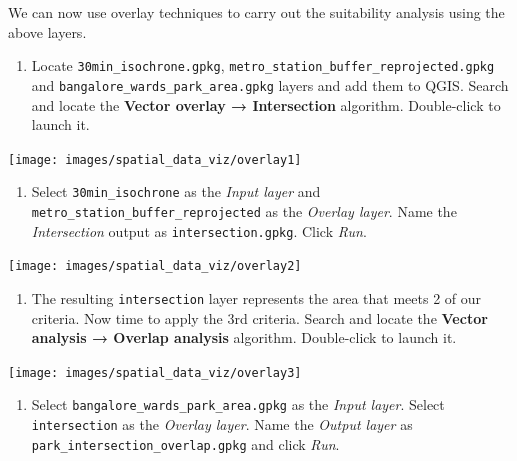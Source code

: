 \documentclass[
  12pt,
  a4paper]{article}
\providecommand{\tightlist}{%
  \setlength{\itemsep}{0pt}\setlength{\parskip}{0pt}}
\begin{document}
We can now use overlay techniques to carry out the suitability analysis
using the above layers.

\begin{enumerate}
\def\labelenumi{\arabic{enumi}.}
\tightlist
\item
  Locate \texttt{30min\_isochrone.gpkg},
  \texttt{metro\_station\_buffer\_reprojected.gpkg} and
  \texttt{bangalore\_wards\_park\_area.gpkg} layers and add them to
  QGIS. Search and locate the \textbf{Vector overlay → Intersection}
  algorithm. Double-click to launch it.
\end{enumerate}

\begin{center}\texttt{[image: images/spatial\_data\_viz/overlay1]} \end{center}

\begin{enumerate}
\def\labelenumi{\arabic{enumi}.}
\setcounter{enumi}{1}
\tightlist
\item
  Select \texttt{30min\_isochrone} as the \emph{Input layer} and
  \texttt{metro\_station\_buffer\_reprojected} as the \emph{Overlay
  layer}. Name the \emph{Intersection} output as
  \texttt{intersection.gpkg}. Click \emph{Run}.
\end{enumerate}

\begin{center}\texttt{[image: images/spatial\_data\_viz/overlay2]} \end{center}

\begin{enumerate}
\def\labelenumi{\arabic{enumi}.}
\setcounter{enumi}{2}
\tightlist
\item
  The resulting \texttt{intersection} layer represents the area that
  meets 2 of our criteria. Now time to apply the 3rd criteria. Search
  and locate the \textbf{Vector analysis → Overlap analysis} algorithm.
  Double-click to launch it.
\end{enumerate}

\begin{center}\texttt{[image: images/spatial\_data\_viz/overlay3]} \end{center}

\begin{enumerate}
\def\labelenumi{\arabic{enumi}.}
\setcounter{enumi}{3}
\tightlist
\item
  Select \texttt{bangalore\_wards\_park\_area.gpkg} as the \emph{Input
  layer}. Select \texttt{intersection} as the \emph{Overlay layer}. Name
  the \emph{Output layer} as \texttt{park\_intersection\_overlap.gpkg}
  and click \emph{Run}.
\end{enumerate}
\end{document}

